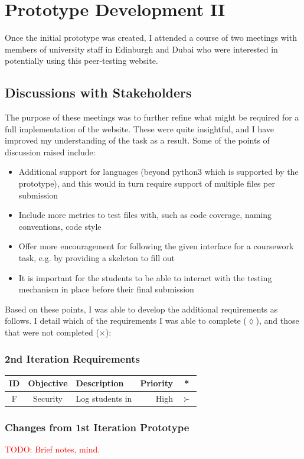 \documentclass[a4paper,11pt]{report}
\newcommand{\todo}[1]{\textcolor{red}{TODO: #1}}
\newcounter{FunCount}
\newcommand{\freq}[4]{\addtocounter{FunCount}{1}F\arabic{FunCount} & #1 & #2 & #3 & #4\\}
\begin{document}
\chapter{Prototype Development II}
Once the initial prototype was created, I attended a course of two meetings with members of university staff in Edinburgh and Dubai who were interested in potentially using this peer-testing website.\par
\section{Discussions with Stakeholders}
The purpose of these meetings was to further refine what might be required for a full implementation of the website. These were quite insightful, and I have improved my understanding of the task as a result. Some of the points of discussion raised include:
\begin{itemize}
\item Additional support for languages (beyond python3 which is supported by the prototype), and this would in turn require support of multiple files per submission
\item Include more metrics to test files with, such as code coverage, naming conventions, code style
\item Offer more encouragement for following the given interface for a coursework task, e.g. by providing a skeleton to fill out
\item It is important for the students to be able to interact with the testing mechanism in place before their final submission
\end{itemize}
Based on these points, I was able to develop the additional requirements as follows. I detail which of the requirements I was able to complete ($\lozenge$), and those that were not completed ($\times$):
\subsection{2nd Iteration Requirements}
\begin{longtable}{cclrc}
\textbf{ID} & \textbf{Objective} & \textbf{Description} & \textbf{Priority} & \textbf{*}\\\hline
\freq{Security}{Log students in}{High}{$\succ$}
\end{longtable}

\subsection{Changes from 1st Iteration Prototype}
\todo{Brief notes, mind.}
\end{document}
